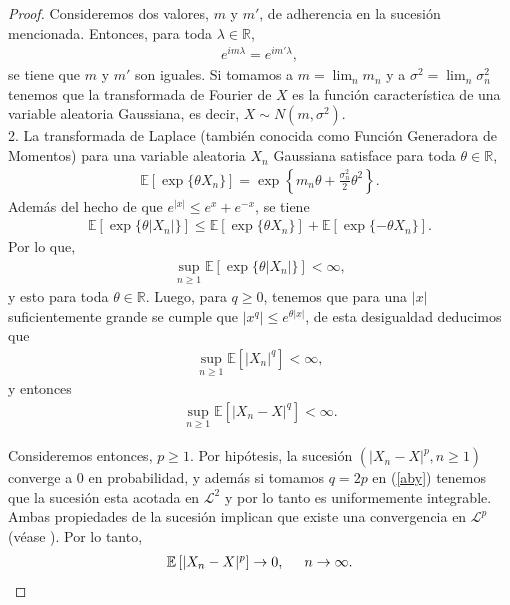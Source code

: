 \begin{proof}
Consideremos dos valores, $m$ y $m'$, de adherencia en la sucesión mencionada. Entonces, para toda $\lambda \in \mathbb{R}$, 
	\begin{align*}
	e^{i m \lambda} = e^{i m' \lambda},
	\end{align*}
se tiene que $m$ y $m'$ son iguales. Si tomamos a $m = \lim_n m_n$ y a $\sigma^2 = \lim_n \sigma_n^2$ tenemos que la transformada de Fourier de $X$ es la función característica de una variable aleatoria Gaussiana, es decir, $X \sim N(m, \sigma^2)$. \\

2. La transformada de Laplace (también conocida como Función Generadora de Momentos) para una variable aleatoria $X_n$ Gaussiana satisface para toda $\theta \in \mathbb{R}$,
	\begin{align*}
	\mathbb{E} \left[ \exp \{\theta X_n\} \right] = \exp \left\{ m_n \theta +  \frac{\sigma_n^2}{2} \theta^2 \right\}. 
	\end{align*}
Además del hecho de que $e^{|x|} \leq e^x + e^{-x}$, se tiene 
	\begin{align*}
	\mathbb{E} \left[ \exp \{ \theta |X_n|\} \right] \leq \mathbb{E}[\exp \{ \theta X_n\}] + \mathbb{E}[\exp \{ - \theta X_n\}].
	\end{align*}
Por lo que, 
	\begin{align*}
	\sup_{n \geq 1} \mathbb{E} \left[ \exp \{ \theta |X_n|\} \right] < \infty,
	\end{align*}
y esto para toda $\theta \in \mathbb{R}$. Luego, para $q \geq 0$, tenemos que para una $|x|$ suficientemente grande se cumple que $|x^q| \leq e^{\theta |x|}$, de esta desigualdad deducimos que
	\begin{align*}
	\sup_{n \geq 1} \mathbb{E} \left[ |X_n|^q \right] < \infty,
	\end{align*}
y entonces
	\begin{align}
	\sup_{n \geq 1} \mathbb{E} \left[ |X_n - X|^q \right] < \infty. \label{aby}
	\end{align}

Consideremos entonces, $p \geq 1$. Por hipótesis, la sucesión $(|X_n - X|^p, n \geq 1)$ converge a 0 en probabilidad, y además si tomamos $q = 2p$ en (\ref{aby}) tenemos que la sucesión esta acotada en $\mathcal{L}^2$ y por lo tanto es uniformemente integrable. Ambas propiedades de la sucesión implican que existe una convergencia en $\mathcal{L}^{p}$ (véase \cite[p.~221]{gut}). Por lo tanto, 
	\begin{align*}
	\mathbb{E} \left[ |X_n - X|^p \right] \rightarrow 0, \hspace{0.5cm} n \rightarrow \infty.
	\end{align*}
\end{proof}

